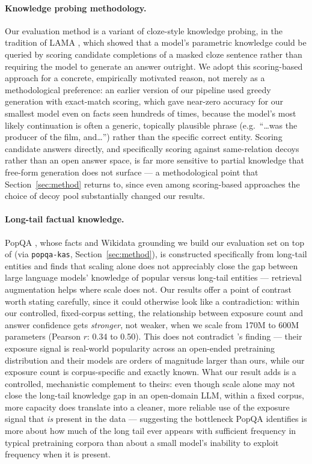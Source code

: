 \documentclass[11pt]{article}
\begin{document}
\paragraph{Knowledge probing methodology.} Our evaluation method is a variant of cloze-style knowledge probing, in the tradition of LAMA \citep{petroni2019language}, which showed that a model's parametric knowledge could be queried by scoring candidate completions of a masked cloze sentence rather than requiring the model to generate an answer outright. We adopt this scoring-based approach for a concrete, empirically motivated reason, not merely as a methodological preference: an earlier version of our pipeline used greedy generation with exact-match scoring, which gave near-zero accuracy for our smallest model even on facts seen hundreds of times, because the model's most likely continuation is often a generic, topically plausible phrase (e.g.\ ``\dots was the producer of the film, and\dots'') rather than the specific correct entity. Scoring candidate answers directly, and specifically scoring against same-relation decoys rather than an open answer space, is far more sensitive to partial knowledge that free-form generation does not surface --- a methodological point that Section~\ref{sec:method} returns to, since even among scoring-based approaches the choice of decoy pool substantially changed our results.

\paragraph{Long-tail factual knowledge.} PopQA \citep{mallen2023whennot}, whose facts and Wikidata grounding we build our evaluation set on top of (via \texttt{popqa-kas}, Section~\ref{sec:method}), is constructed specifically from long-tail entities and finds that scaling alone does not appreciably close the gap between large language models' knowledge of popular versus long-tail entities --- retrieval augmentation helps where scale does not. Our results offer a point of contrast worth stating carefully, since it could otherwise look like a contradiction: within our controlled, fixed-corpus setting, the relationship between exposure count and answer confidence gets \emph{stronger}, not weaker, when we scale from 170M to 600M parameters (Pearson $r$: 0.34 to 0.50). This does not contradict \citeauthor{mallen2023whennot}'s finding --- their exposure signal is real-world popularity across an open-ended pretraining distribution and their models are orders of magnitude larger than ours, while our exposure count is corpus-specific and exactly known. What our result adds is a controlled, mechanistic complement to theirs: even though scale alone may not close the long-tail knowledge gap in an open-domain LLM, within a fixed corpus, more capacity does translate into a cleaner, more reliable use of the exposure signal that \emph{is} present in the data --- suggesting the bottleneck PopQA identifies is more about how much of the long tail ever appears with sufficient frequency in typical pretraining corpora than about a small model's inability to exploit frequency when it is present.
\end{document}
